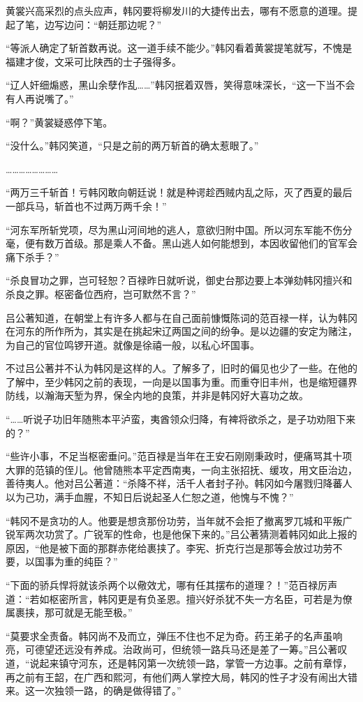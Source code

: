 黄裳兴高采烈的点头应声，韩冈要将柳发川的大捷传出去，哪有不愿意的道理。提起了笔，边写边问：“朝廷那边呢？”

“等派人确定了斩首数再说。这一道手续不能少。”韩冈看着黄裳提笔就写，不愧是福建才俊，文采可比陕西的士子强得多。

“辽人奸细煽惑，黑山余孽作乱……”韩冈抿着双唇，笑得意味深长，“这一下当不会有人再说嘴了。”

“啊？”黄裳疑惑停下笔。

“没什么。”韩冈笑道，“只是之前的两万斩首的确太惹眼了。”

……………………

“两万三千斩首！亏韩冈敢向朝廷说！就是种谔趁西贼内乱之际，灭了西夏的最后一部兵马，斩首也不过两万两千余！”

“河东军所斩党项，尽为黑山河间地的逃人，意欲归附中国。所以河东军能不伤分毫，便有数万首级。那是乘人不备。黑山逃人如何能想到，本因收留他们的官军会痛下杀手？”

“杀良冒功之罪，岂可轻恕？百禄昨日就听说，御史台那边要上本弹劾韩冈擅兴和杀良之罪。枢密备位西府，岂可默然不言？”

吕公著知道，在朝堂上有许多人都与在自己面前慷慨陈词的范百禄一样，认为韩冈在河东的所作所为，其实是在挑起宋辽两国之间的纷争。是以边疆的安定为赌注，为自己的官位鸣锣开道。就像是徐禧一般，以私心坏国事。

不过吕公著并不认为韩冈是这样的人。了解多了，旧时的偏见也少了一些。在他的了解中，至少韩冈之前的表现，一向是以国事为重。而重夺旧丰州，也是缩短疆界防线，以瀚海天堑为界，保全内地的良策，并非是韩冈好大喜功之故。

“……听说子功旧年随熊本平泸蛮，夷酋领众归降，有裨将欲杀之，是子功劝阻下来的？”

“些许小事，不足当枢密垂问。”范百禄是当年在王安石刚刚秉政时，便痛骂其十项大罪的范镇的侄儿。他曾随熊本平定西南夷，一向主张招抚、缓攻，用文臣治边，善待夷人。他对吕公著道：“杀降不祥，活千人者封子孙。韩冈如今屠戮归降蕃人以为己功，满手血腥，不知日后说起圣人仁恕之道，他愧与不愧？”

“韩冈不是贪功的人。他要是想贪那份功劳，当年就不会拒了撤离罗兀城和平叛广锐军两次功赏了。广锐军的性命，也是他保下来的。”吕公著猜测着韩冈如此上报的原因，“他是被下面的那群赤佬给裹挟了。李宪、折克行岂是那等会放过功劳不要，以国事为重的纯臣？”

“下面的骄兵悍将就该杀两个以儆效尤，哪有任其摆布的道理？！”范百禄厉声道：“若如枢密所言，韩冈更是有负圣恩。擅兴好杀犹不失一方名臣，可若是为僚属裹挟，那可就是无能至极。”

“莫要求全责备。韩冈尚不及而立，弹压不住也不足为奇。药王弟子的名声虽响亮，可德望还远没有养成。治政尚可，但统领一路兵马还是差了一筹。”吕公著叹道，“说起来镇守河东，还是韩冈第一次统领一路，掌管一方边事。之前有章惇，再之前有王韶，在广西和熙河，有他们两人掌控大局，韩冈的性子才没有闹出大错来。这一次独领一路，的确是做得错了。”

